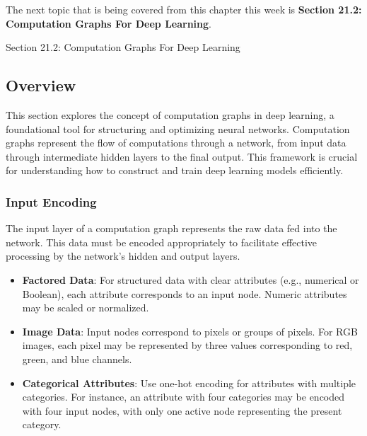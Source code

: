 The next topic that is being covered from this chapter this week is \textbf{Section 21.2: Computation Graphs For Deep Learning}.

\begin{notes}{Section 21.2: Computation Graphs For Deep Learning}
    \subsection*{Overview}

    This section explores the concept of computation graphs in deep learning, a foundational tool for structuring and optimizing neural networks. Computation graphs represent the flow of computations 
    through a network, from input data through intermediate hidden layers to the final output. This framework is crucial for understanding how to construct and train deep learning models efficiently.
    
    \subsubsection*{Input Encoding}
    
    The input layer of a computation graph represents the raw data fed into the network. This data must be encoded appropriately to facilitate effective processing by the network's hidden and output layers.
    
    \begin{highlight}
    
        \begin{itemize}
            \item \textbf{Factored Data}: For structured data with clear attributes (e.g., numerical or Boolean), each attribute corresponds to an input node. Numeric attributes may be scaled or normalized.
            \item \textbf{Image Data}: Input nodes correspond to pixels or groups of pixels. For RGB images, each pixel may be represented by three values corresponding to red, green, and blue channels.
            \item \textbf{Categorical Attributes}: Use one-hot encoding for attributes with multiple categories. For instance, an attribute with four categories may be encoded with four input nodes, with only 
            one active node representing the present category.
        \end{itemize}
    
    \end{highlight}
    

\end{notes}
